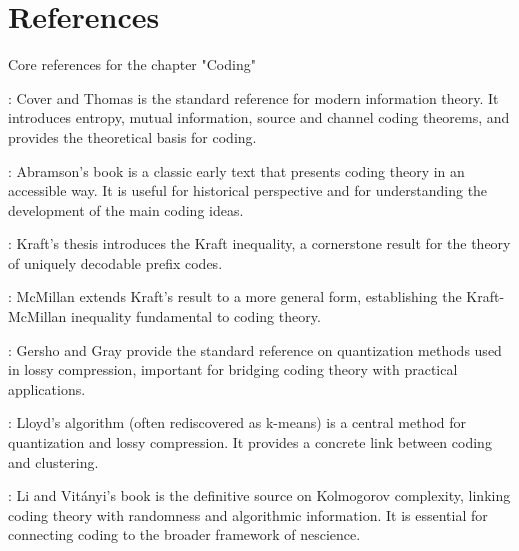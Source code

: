 %
%

\section*{References}

Core references for the chapter "Coding"

\cite{cover2012elements}: Cover and Thomas is the standard reference for modern information theory. It introduces entropy, mutual information, source and channel coding theorems, and provides the theoretical basis for coding.

\cite{abramson1963information}: Abramson's book is a classic early text that presents coding theory in an accessible way. It is useful for historical perspective and for understanding the development of the main coding ideas.

\cite{kraft1949device}: Kraft’s thesis introduces the Kraft inequality, a cornerstone result for the theory of uniquely decodable prefix codes.

\cite{mcmillan1956two}: McMillan extends Kraft's result to a more general form, establishing the Kraft-McMillan inequality fundamental to coding theory.

\cite{gersho2012vector}: Gersho and Gray provide the standard reference on quantization methods used in lossy compression, important for bridging coding theory with practical applications.

\cite{lloyd1982least}: Lloyd’s algorithm (often rediscovered as k-means) is a central method for quantization and lossy compression. It provides a concrete link between coding and clustering.

\cite{li2013introduction}: Li and Vitányi’s book is the definitive source on Kolmogorov complexity, linking coding theory with randomness and algorithmic information. It is essential for connecting coding to the broader framework of nescience.




